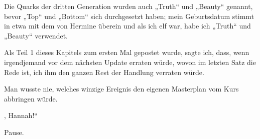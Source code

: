 
\begin{chapterOpeningAuthorNote}



Die Quarks der dritten Generation wurden auch „Truth“ und „Beauty“ genannt, bevor „Top“ und „Bottom“ sich durchgesetzt haben; mein Geburtsdatum stimmt in etwa mit dem von Hermine überein und als ich elf war, habe ich „Truth“ und „Beauty“ verwendet.

Als Teil 1 dieses Kapitels zum ersten Mal gepostet wurde, sagte ich, dass, wenn irgendjemand vor dem nächsten Update erraten würde, wovon im letzten Satz die Rede ist, ich ihm den ganzen Rest der Handlung verraten würde.
\end{chapterOpeningAuthorNote}
\begin{chapterOpeningQuote}
Man wusste nie, welches winzige Ereignis den eigenen Masterplan vom Kurs abbringen würde.
\end{chapterOpeningQuote}

, Hannah!“

\hplettrineextrapara
Pause.








